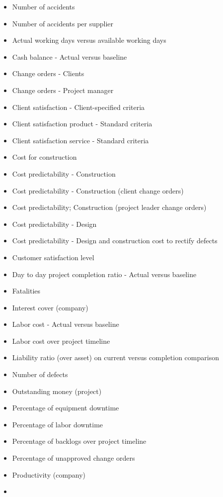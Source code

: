 \documentclass[]{book}
\providecommand{\tightlist}{%
  \setlength{\itemsep}{0pt}\setlength{\parskip}{0pt}}
\begin{document}
\begin{itemize}
\tightlist
\item
  Number of accidents
\item
  Number of accidents per supplier
\item
  Actual working days versus available working days
\item
  Cash balance - Actual versus baseline
\item
  Change orders - Clients
\item
  Change orders - Project manager
\item
  Client satisfaction - Client-specified criteria
\item
  Client satisfaction product - Standard criteria
\item
  Client satisfaction service - Standard criteria
\item
  Cost for construction
\item
  Cost predictability - Construction
\item
  Cost predictability - Construction (client change orders)
\item
  Cost predictability; Construction (project leader change orders)
\item
  Cost predictability - Design
\item
  Cost predictability - Design and construction cost to rectify defects
\item
  Customer satisfaction level
\item
  Day to day project completion ratio - Actual versus baseline
\item
  Fatalities
\item
  Interest cover (company)
\item
  Labor cost - Actual versus baseline
\item
  Labor cost over project timeline
\item
  Liability ratio (over asset) on current versus completion comparison
\item
  Number of defects
\item
  Outstanding money (project)
\item
  Percentage of equipment downtime
\item
  Percentage of labor downtime
\item
  Percentage of backlogs over project timeline
\item
  Percentage of unapproved change orders
\item
  Productivity (company)
\item

\end{itemize}
\end{document}
